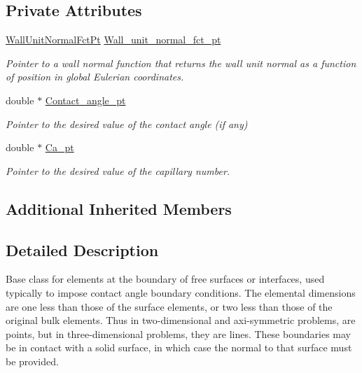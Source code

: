 \subsection*{Private Attributes}
\begin{DoxyCompactItemize}
\item 
\hyperlink{classoomph_1_1FluidInterfaceBoundingElement_a09c0b1df7d653eaf55e94e3951d409dd}{Wall\+Unit\+Normal\+Fct\+Pt} \hyperlink{classoomph_1_1FluidInterfaceBoundingElement_abc765a3b2c4eac762a1a5ba85ac4a7a4}{Wall\+\_\+unit\+\_\+normal\+\_\+fct\+\_\+pt}
\begin{DoxyCompactList}\small\item\em Pointer to a wall normal function that returns the wall unit normal as a function of position in global Eulerian coordinates. \end{DoxyCompactList}\item 
double $\ast$ \hyperlink{classoomph_1_1FluidInterfaceBoundingElement_a351532c356c9e839cba87150bea354c5}{Contact\+\_\+angle\+\_\+pt}
\begin{DoxyCompactList}\small\item\em Pointer to the desired value of the contact angle (if any) \end{DoxyCompactList}\item 
double $\ast$ \hyperlink{classoomph_1_1FluidInterfaceBoundingElement_abf47719443253c1117705b0a20e9ef70}{Ca\+\_\+pt}
\begin{DoxyCompactList}\small\item\em Pointer to the desired value of the capillary number. \end{DoxyCompactList}\end{DoxyCompactItemize}
\subsection*{Additional Inherited Members}


\subsection{Detailed Description}
Base class for elements at the boundary of free surfaces or interfaces, used typically to impose contact angle boundary conditions. The elemental dimensions are one less than those of the surface elements, or two less than those of the original bulk elements. Thus in two-\/dimensional and axi-\/symmetric problems, are points, but in three-\/dimensional problems, they are lines. These boundaries may be in contact with a solid surface, in which case the normal to that surface must be provided. 

